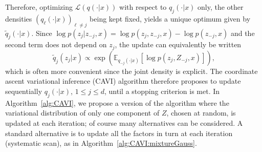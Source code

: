 \documentclass[english,graybox,envcountchap,envcountsame,sectrefs,shortlabels]{svmono}
\theoremstyle{style}
\newcommand{\eqsp}{}
\begin{document}
Therefore, optimizing $\mathcal{L}(q(\cdot|x)) $ with respect to $q_j(\cdot|x)$ only, the other densities $(q_\ell(\cdot|x))_{\ell\neq j}$ being kept fixed, yields a unique optimum given by $\tilde q_j(\cdot|x)$. Since $\log p(z_j|z_{-j},x) = \log p(z_j,z_{-j},x) - \log p(z_{-j},x)$ and the second term does not depend on $z_j$, the update can equivalently be written
\begin{equation}
\label{eq:cavi:update}
\tilde q_j(z_j|x) \propto \exp\left(\mathbb{E}_{q_{-j}(\cdot|x)}\left[\log p(z_j, Z_{-j},x)\right]\right)\eqsp,
\end{equation}
which is often more convenient since the joint density is explicit.
The coordinate ascent variational inference (CAVI) algorithm therefore proposes to update sequentially $q_j(\cdot|x)$, $1\leq j \leq d$, until a stopping criterion is met. In Algorithm~\ref{alg:CAVI}, we propose a version of the algorithm where the variational distribution of only one component of $Z$, chosen at random, is updated at each iteration; of course many alternatives can be considered. A standard alternative is to update all the factors in turn at each iteration (systematic scan), as in Algorithm~\ref{alg:CAVI:mixtureGauss}.


\begin{algorithm}[H]
\caption{Coordinate ascent variational inference (random scan).}
\label{alg:CAVI}
\end{algorithm}
\end{document}
